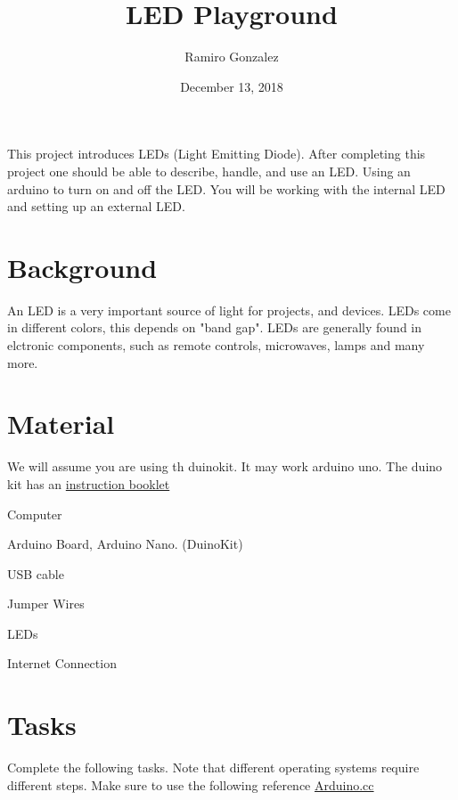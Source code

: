 \documentclass[12pt]{article}
\begin{document}
\title{LED Playground}
\author{Ramiro Gonzalez}
\date{December 13, 2018}

\maketitle

\begin{Objective}
	This project introduces LEDs (Light Emitting Diode). After completing this project one should be able to describe, handle, and use an LED.  Using an arduino to turn on and off the LED. You will be working with the internal LED and setting up an external LED. 
\end{Objective}

\section*{Background}
	An LED is a very important source of light for projects, and devices. LEDs come in different colors, this depends on "band gap". LEDs are generally found in elctronic components, such as remote controls, microwaves, lamps and many more. 
\section*{Material}
We will assume you are using th duinokit. It may work arduino uno. The duino kit has an \color{red} \href{https://drive.google.com/file/d/0B4XGOMubJWWralp1TlBEcnI4NnM/view?usp=sharing}{instruction booklet} \color{black}  
\begin{todolist}
    \item Computer 
    \item Arduino Board, Arduino Nano. (DuinoKit) 
    \item USB cable
    \item Jumper Wires
    \item LEDs
    \item Internet Connection
\end{todolist}
\section{Tasks}
Complete the following tasks. Note that different operating systems require different steps. Make sure to use the following reference \href{www.arduino.cc}{Arduino.cc}
\end{document}
